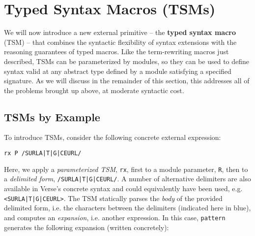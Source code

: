 
\section{Typed Syntax Macros (TSMs)}\label{sec:tsms}
We will now introduce a new external primitive -- the \textbf{typed syntax macro} (TSM) -- that combines the syntactic flexibility of syntax extensions with the reasoning guarantees of typed macros. Like the term-rewriting macros just described, TSMs can be parameterized by modules, so they can be used to define syntax valid at any abstract type defined by a module satisfying a specified signature. As we will discuss in the remainder of this section, this addresses all of the problems brought up above, at moderate syntactic cost.


\subsection{TSMs by Example}\label{sec:tsms-by-example}
To introduce TSMs, consider the following concrete external expression:
\begin{lstlisting}[numbers=none]
rx P /SURLA|T|G|CEURL/
\end{lstlisting}
Here, we apply a \emph{parameterized TSM}, \lstinline{rx}, first to a module parameter, \lstinline{R}, then to a \emph{delimited form}, \lstinline{/SURLA|T|G|CEURL/}. A number of alternative delimiters are also available in Verse's concrete syntax and could equivalently have been used, e.g. \lstinline{<SURLA|T|G|CEURL>}. The TSM statically parses the \emph{body} of the provided delimited form, i.e. the characters between the delimiters (indicated here in blue), and computes an \emph{expansion}, i.e. another expression. In this case, \lstinline{pattern} generates the following expansion (written concretely):

